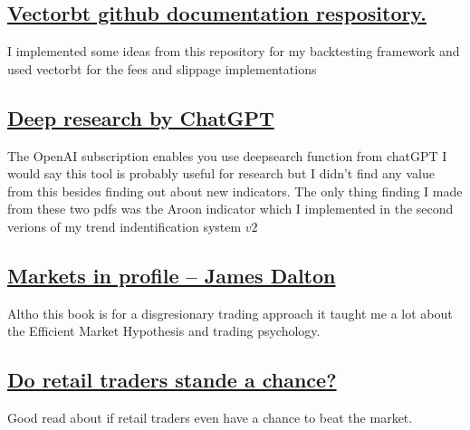 \documentclass[12pt]{article}
\begin{document}
{\subsection{\href{https://github.com/polakowo/vectorbt}{Vectorbt github documentation respository.}} I implemented some ideas from this repository for my backtesting framework and used vectorbt for the fees and slippage implementations


\subsection{\href{https://github.com/AJslashTracey/deep_research_chatGPT_03}{Deep research by ChatGPT}}
The OpenAI subscription enables you use deepsearch function from chatGPT I would say this tool is probably useful for research but I didn't find any value from this besides finding out about new indicators. The only thing finding I made from these two pdfs was the Aroon indicator which I implemented in the second verions of my trend indentification system $v2$


\subsection{\href{https://www.r-5.org/files/books/trading/charts/market-profile/James_Dalton-Markets_in_Profile-EN.pdf}{Markets in profile -- James Dalton}}
Altho this book is for a disgresionary trading approach it taught me a lot about the Efficient Market Hypothesis and trading psychology.

\subsection{\href{https://x.com/i/grok/share/q9fAogSBPA92zR0lgXd4q9OZT}{Do retail traders stande a chance?}}

Good read about if retail traders even have a chance to beat the market.
}
\end{document}
